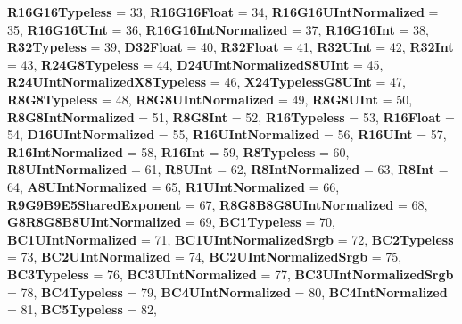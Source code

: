 \begin{DoxyCompactItemize}
\newline
{\bfseries R16\+G16\+Typeless} = 33, 
{\bfseries R16\+G16\+Float} = 34, 
{\bfseries R16\+G16\+U\+Int\+Normalized} = 35, 
{\bfseries R16\+G16\+U\+Int} = 36, 
\newline
{\bfseries R16\+G16\+Int\+Normalized} = 37, 
{\bfseries R16\+G16\+Int} = 38, 
{\bfseries R32\+Typeless} = 39, 
{\bfseries D32\+Float} = 40, 
\newline
{\bfseries R32\+Float} = 41, 
{\bfseries R32\+U\+Int} = 42, 
{\bfseries R32\+Int} = 43, 
{\bfseries R24\+G8\+Typeless} = 44, 
\newline
{\bfseries D24\+U\+Int\+Normalized\+S8\+U\+Int} = 45, 
{\bfseries R24\+U\+Int\+Normalized\+X8\+Typeless} = 46, 
{\bfseries X24\+Typeless\+G8\+U\+Int} = 47, 
{\bfseries R8\+G8\+Typeless} = 48, 
\newline
{\bfseries R8\+G8\+U\+Int\+Normalized} = 49, 
{\bfseries R8\+G8\+U\+Int} = 50, 
{\bfseries R8\+G8\+Int\+Normalized} = 51, 
{\bfseries R8\+G8\+Int} = 52, 
\newline
{\bfseries R16\+Typeless} = 53, 
{\bfseries R16\+Float} = 54, 
{\bfseries D16\+U\+Int\+Normalized} = 55, 
{\bfseries R16\+U\+Int\+Normalized} = 56, 
\newline
{\bfseries R16\+U\+Int} = 57, 
{\bfseries R16\+Int\+Normalized} = 58, 
{\bfseries R16\+Int} = 59, 
{\bfseries R8\+Typeless} = 60, 
\newline
{\bfseries R8\+U\+Int\+Normalized} = 61, 
{\bfseries R8\+U\+Int} = 62, 
{\bfseries R8\+Int\+Normalized} = 63, 
{\bfseries R8\+Int} = 64, 
\newline
{\bfseries A8\+U\+Int\+Normalized} = 65, 
{\bfseries R1\+U\+Int\+Normalized} = 66, 
{\bfseries R9\+G9\+B9\+E5\+Shared\+Exponent} = 67, 
{\bfseries R8\+G8\+B8\+G8\+U\+Int\+Normalized} = 68, 
\newline
{\bfseries G8\+R8\+G8\+B8\+U\+Int\+Normalized} = 69, 
{\bfseries B\+C1\+Typeless} = 70, 
{\bfseries B\+C1\+U\+Int\+Normalized} = 71, 
{\bfseries B\+C1\+U\+Int\+Normalized\+Srgb} = 72, 
\newline
{\bfseries B\+C2\+Typeless} = 73, 
{\bfseries B\+C2\+U\+Int\+Normalized} = 74, 
{\bfseries B\+C2\+U\+Int\+Normalized\+Srgb} = 75, 
{\bfseries B\+C3\+Typeless} = 76, 
\newline
{\bfseries B\+C3\+U\+Int\+Normalized} = 77, 
{\bfseries B\+C3\+U\+Int\+Normalized\+Srgb} = 78, 
{\bfseries B\+C4\+Typeless} = 79, 
{\bfseries B\+C4\+U\+Int\+Normalized} = 80, 
\newline
{\bfseries B\+C4\+Int\+Normalized} = 81, 
{\bfseries B\+C5\+Typeless} = 82, 

\end{DoxyCompactItemize}
